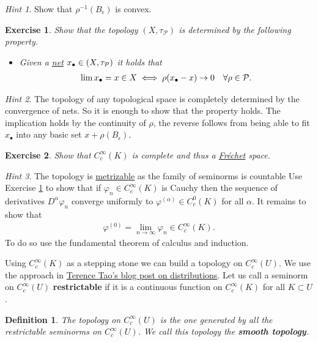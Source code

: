 \documentclass[12pt]{article}
\newtheorem{definition}{Definition}
\newtheorem{exercise}{Exercise}
\theoremstyle{remark}
\newtheorem*{hint}{Hint}
\begin{document}
\begin{hint}
	Show that $\rho^{-1}(B_\epsilon)$ is convex.
\end{hint}
\begin{exercise}\label{convergence TVS}
	Show that the topology $(X,\tau_\mathcal{P})$ is determined by the following property.
	\begin{itemize}
		\item  Given a \href{https://en.wikipedia.org/wiki/Net_(mathematics)#:~:text=%5Bedit%5D-,Any,-function%20whose%20domain}{net} $x_\bullet\in (X,\tau_{\mathcal{P}})$  it holds that
		      \begin{align*}
			      \lim x_\bullet =x \in  X  \iff      \rho(x_\bullet-x)\to 0 \quad\forall \rho \in \mathcal{P}.
		      \end{align*}
	\end{itemize}
\end{exercise}
\begin{hint}
	The topology of any topological space is completely determined by the convergence of nets. So it is enough to show that the property holds. The implication holds by the continuity of  $\rho$, the reverse follows from being able to fit $x_\bullet$ into any basic set $x+\rho(B_\epsilon)$.
\end{hint}
\begin{exercise}
	Show that $C_c^\infty(K)$ is complete and thus a \href{https://en.wikipedia.org/wiki/Fr%C3%A9chet_space#:~:text=locally%20convex%20metrizable%20topological%20vector%20space}{Fréchet} space.
\end{exercise}
\begin{hint}
	The topology is \href{https://nowheredifferentiable.com/2023-01-29-PDE-1-Fourier/#:~:text=together-,with,-a%20countable%20family}{metrizable} as the family of seminorms is countable
	Use Exercise \ref{convergence TVS}  to show that if $\varphi_n \in C_c^\infty(K)$ is Cauchy then the sequence of derivatives $D^\alpha \varphi_n $ converge uniformly to $\varphi^{(\alpha)} \in C_c^0(K)$ for all $\alpha$. It remains to show that
	\begin{align*}
		\varphi^{(0)}= \lim_{n \to \infty} \varphi_n \in  C_c^\infty(K).
	\end{align*}
	To do so use the fundamental theorem of calculus and induction.
\end{hint}
Using $C_c^\infty(K)$ as a stepping stone we can build a topology on $C_c^\infty(U)$. We use the approach in \href{https://terrytao.wordpress.com/2009/04/19/245c-notes-3-distributions/#:~:text=is%20clearly%20a-,vector,-space.%20Now%20we}{Terence Tao's blog post on distributions}. Let us call a seminorm on $C_c^\infty(U)$ \textbf{restrictable} if it is a continuous function on $C_c^\infty(K)$ for all $K \subset U$.     \begin{definition}        The topology on $C_c^\infty(U)$ is the one generated by all the restrictable seminorms on $C_c^\infty(U)$. We call this topology the \textbf{smooth topology}.
\end{definition}
\end{document}
